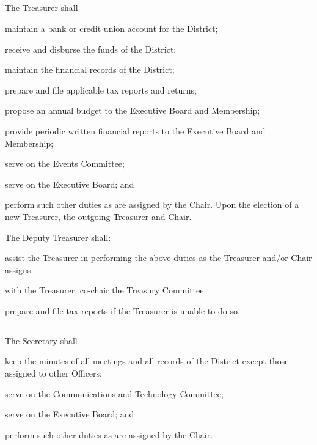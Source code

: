 \subsection{}
The Treasurer shall
\begin{inlinealphalist}
    \item maintain a bank or credit union account for the \fortythird{} District;
    \item receive and disburse the funds of the \fortythird{} District;
    \item maintain the financial records of the \fortythird{} District;
    \item prepare and file applicable tax reports and returns;
    \item propose an annual budget to the Executive Board and Membership;
    \item provide periodic written financial reports to the Executive Board and Membership;
    \item serve on the Events Committee;
    \item serve on the Executive Board; and
    \item perform such other duties as are assigned by the Chair. Upon the election of a new Treasurer, the outgoing Treasurer and Chair.
\end{inlinealphalist}

The Deputy Treasurer shall:
\begin{inlinealphalist}
    \item assist the Treasurer in performing the above duties as the Treasurer and/or Chair assigns
    \item with the Treasurer, co-chair the Treasury Committee
    \item prepare and file tax reports if the Treasurer is unable to do so.
\end{inlinealphalist}

\subsection{}
The Secretary shall
\begin{inlinealphalist}
    \item keep the minutes of all meetings and all records of the \fortythird{} District except those assigned to other Officers;
    \item serve on the Communications and Technology Committee;
    \item serve on the Executive Board; and
    \item perform such other duties as are assigned by the Chair.
\end{inlinealphalist}


